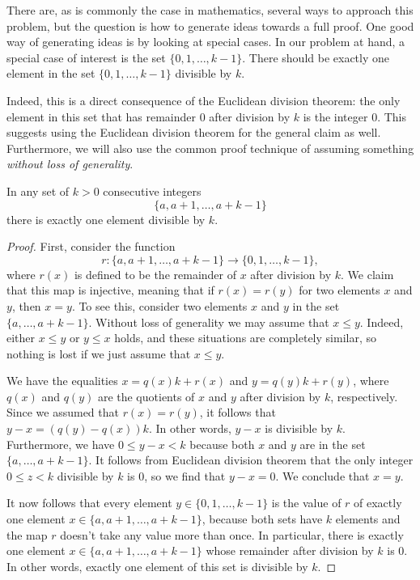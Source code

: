 There are, as is commonly the case in mathematics, several ways to approach this problem, but the question is how to generate ideas towards a full proof. One good way of generating ideas is by looking at special cases. In our problem at hand, a special case of interest is the set $\{0,1,\ldots,k-1\}$. There should be exactly one element in the set $\{0,1,\ldots,k-1\}$ divisible by $k$.

Indeed, this is a direct consequence of the Euclidean division theorem: the only element in this set that has remainder $0$ after division by $k$ is the integer $0$. This suggests using the Euclidean division theorem for the general claim as well. Furthermore, we will also use the common proof technique of assuming something \emph{without loss of generality}.

\begin{proposition}
  In any set of $k>0$ consecutive integers
  \begin{equation*}
    \{a,a+1,\ldots,a+k-1\}
  \end{equation*}
  there is exactly one element divisible by $k$.
\end{proposition}

\begin{proof}
  First, consider the function
  \begin{equation*}
    r : \{a,a+1,\ldots,a+k-1\} \to \{0,1,\ldots,k-1\},
  \end{equation*}
  where $r(x)$ is defined to be the remainder of $x$ after division by $k$. We claim that this map is injective, meaning that if $r(x)=r(y)$ for two elements $x$ and $y$, then $x=y$. To see this, consider two elements $x$ and $y$ in the set $\{a,\ldots,a+k-1\}$. Without loss of generality we may assume that $x\leq y$. Indeed, either $x\leq y$ or $y\leq x$ holds, and these situations are completely similar, so nothing is lost if we just assume that $x\leq y$.

  We have the equalities $x=q(x)k+r(x)$ and $y=q(y)k+r(y)$, where $q(x)$ and $q(y)$ are the quotients of $x$ and $y$ after division by $k$, respectively. Since we assumed that $r(x)=r(y)$, it follows that $y-x=(q(y)-q(x))k$. In other words, $y-x$ is divisible by $k$. Furthermore, we have $0\leq y-x <k$ because both $x$ and $y$ are in the set $\{a,\ldots,a+k-1\}$. It follows from Euclidean division theorem that the only integer $0\leq z <k$ divisible by $k$ is $0$, so we find that $y-x=0$. We conclude that $x=y$.

  It now follows that every element $y\in\{0,1,\ldots,k-1\}$ is the value of $r$ of exactly one element $x\in\{a,a+1,\ldots,a+k-1\}$, because both sets have $k$ elements and the map $r$ doesn't take any value more than once. In particular, there is exactly one element $x\in\{a,a+1,\ldots,a+k-1\}$ whose remainder after division by $k$ is $0$. In other words, exactly one element of this set is divisible by $k$.
\end{proof}

